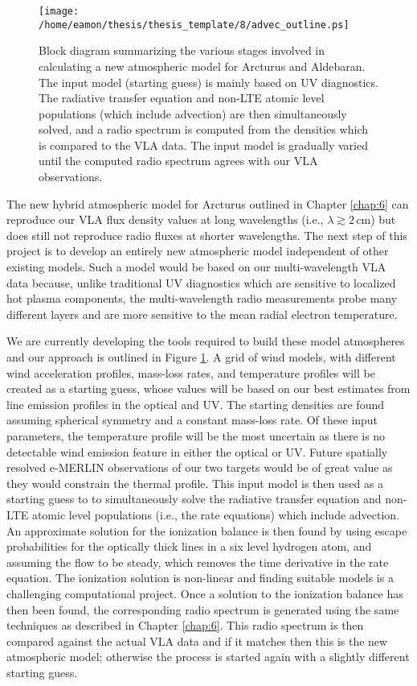 \begin{figure}[!]
\centering 
        \texttt{[image: /home/eamon/thesis/thesis\_template/8/advec\_outline.ps]}
\caption[Block diagram for atmospheric model development.]{Block diagram summarizing the various stages involved in calculating a new atmospheric model for Arcturus and Aldebaran. The input model (starting guess) is mainly based on UV diagnostics. The radiative transfer equation and non-LTE atomic level populations (which include advection) are then simultaneously solved, and a radio spectrum is computed from the densities which is compared to the VLA data. The input model is gradually varied until the computed radio spectrum agrees with our VLA observations.} 
\label{fig:8.4}
\end{figure}

The new hybrid atmospheric model for Arcturus outlined in Chapter \ref{chap:6} can reproduce our VLA flux density values at long wavelengths (i.e., $\lambda \gtrsim 2\,$cm) but does still not reproduce radio fluxes at shorter wavelengths. The next step of this project is to develop an entirely new atmospheric model independent of other existing models. Such a model would be based on our multi-wavelength VLA data because, unlike traditional UV diagnostics which are sensitive to localized hot plasma components, the multi-wavelength radio measurements probe many different layers and are more sensitive to the mean radial electron temperature.

We are currently developing the tools required to build these model atmospheres and our approach is outlined in Figure \ref{fig:8.4}. A grid of wind models, with different wind acceleration profiles, mass-loss rates, and temperature profiles will be created as a starting guess, whose values will be based on our best estimates from line emission profiles in the optical and UV. The starting densities are found assuming spherical symmetry and a constant mass-loss rate. Of these input parameters, the temperature profile will be the most uncertain as there is no detectable wind emission feature in either the optical or UV. Future spatially resolved e-MERLIN observations of our two targets would be of great value as they would constrain the thermal profile. This input model is then used as a starting guess to to simultaneously solve the radiative transfer equation and non-LTE atomic level populations (i.e., the rate equations) which include advection. An approximate solution for the ionization balance is then found by using escape probabilities for the optically thick lines in a six level hydrogen atom, and assuming the flow to be steady, which removes the time derivative in the rate equation. The ionization solution is non-linear and finding suitable models is a challenging computational project. Once a solution to the ionization balance has then been found, the corresponding radio spectrum is generated using the same techniques as described in Chapter \ref{chap:6}. This radio spectrum is then compared against the actual VLA data and if it matches then this is the new atmospheric model; otherwise the process is started again with a slightly different starting guess.


